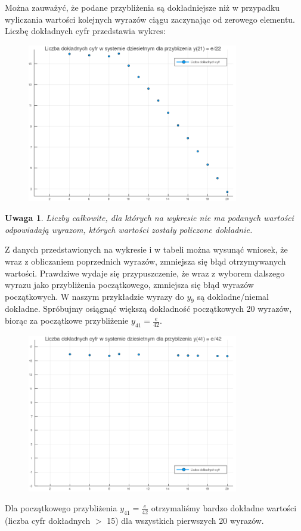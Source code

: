 \documentclass[11pt,wide]{article}
\newtheorem{remark}{Uwaga}
\begin{document}
\clearpage
Można zauważyć, że podane przybliżenia są dokładniejsze niż w przypadku wyliczania wartości kolejnych wyrazów ciągu zaczynając od zerowego elementu. Liczbę dokładnych cyfr przedstawia wykres:
\begin{figure}[h!]
	\centering
	\includegraphics[width=0.82\textwidth]{plot2}
\end{figure}
\begin{remark}
Liczby całkowite, dla których na wykresie nie ma podanych wartości odpowiadają wyrazom, których wartości zostały policzone dokładnie.
\end{remark}
Z danych przedstawionych na wykresie i w tabeli można wysunąć wniosek, że wraz z obliczaniem poprzednich wyrazów, zmniejsza się błąd otrzymywanych wartości. Prawdziwe wydaje się przypuszczenie, że wraz z wyborem dalszego wyrazu jako przybliżenia początkowego, zmniejsza się błąd wyrazów początkowych. W naszym przykładzie wyrazy do \(y_9\) są dokładne/niemal dokładne. Spróbujmy osiągnąć większą dokładność początkowych 20 wyrazów, biorąc za początkowe przybliżenie \(y_{41} = \frac{e}{42}\).
\clearpage 

\begin{figure}[h!]
	\centering
	\includegraphics[width=0.82\textwidth]{plot3}
\end{figure}
Dla początkowego przybliżenia \(y_{41} = \frac{e}{42}\) otrzymaliśmy bardzo dokładne wartości (liczba cyfr dokładnych \(>\) 15) dla wszystkich pierwszych 20 wyrazów.
\end{document}
